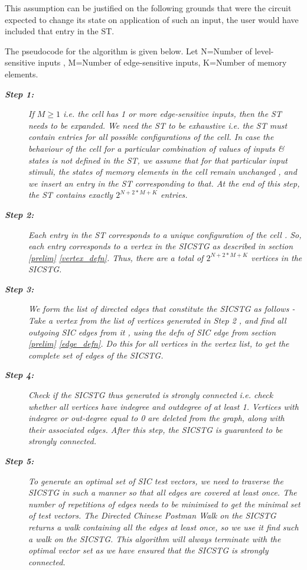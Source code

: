 \documentclass[final]{ieee}
\begin{document}
This assumption can be justified on the following grounds that were the circuit expected to change its state on application of such an input, the user would have included that entry in the ST. 

The pseudocode for the algorithm is given below.
Let N=Number of level-sensitive inputs , M=Number of edge-sensitive inputs, K=Number of memory elements.

\begin{description}
\item [\textit{\textbf{Step 1:}}] \textit{If $M \geq 1$ i.e. the cell has 1 or more edge-sensitive inputs, then the ST needs to be expanded. We need the ST to be exhaustive i.e. the ST must contain entries for all possible configurations of the cell. In case the behaviour of the cell for a particular combination of values of inputs \& states is not defined in the ST, we assume that for that particular input stimuli, the states of memory elements in the cell remain unchanged , and we insert an entry in the ST corresponding to that. At the end of this step, the ST contains exactly $2^{N+2*M+K}$ entries.}

\item [\textit{\textbf{Step 2:}}] \textit{Each entry in the ST corresponds to a unique configuration of the cell . So, each entry corresponds to a vertex in the SICSTG as described in section \ref{prelim} \ref{vertex_defn}. Thus, there are a total of $2^{N+2*M+K}$ vertices in the SICSTG.}

\item [\textit{\textbf{Step 3:}}] \textit{We form the list of directed edges that constitute the SICSTG as follows - Take a vertex from the list of vertices generated in Step 2 , and find all outgoing SIC edges from it , using the defn of SIC edge from section \ref{prelim} \ref{edge_defn}. Do this for all vertices in the vertex list, to get the complete set of edges of the SICSTG.}

\item [\textit{\textbf{Step 4:}}] \textit{Check if the SICSTG thus generated is strongly connected i.e. check whether all vertices have indegree and outdegree of at least 1. Vertices with indegree or out-degree equal to 0 are deleted from the graph, along with their associated edges. After this step, the SICSTG is guaranteed to be strongly connected.}

\item [\textit{\textbf{Step 5:}}] \textit{To generate an optimal set of SIC test vectors, we need to traverse the SICSTG in such a manner so that all edges are covered at least once. The number of repetitions of edges needs to be minimised to get the minimal set of test vectors. The Directed Chinese Postman Walk on the SICSTG returns a walk containing all the edges at least once, so we use it find such a walk on the SICSTG. This algorithm will always terminate with the optimal vector set as we have ensured that the SICSTG is strongly connected.}
\end{description}
\end{document}
